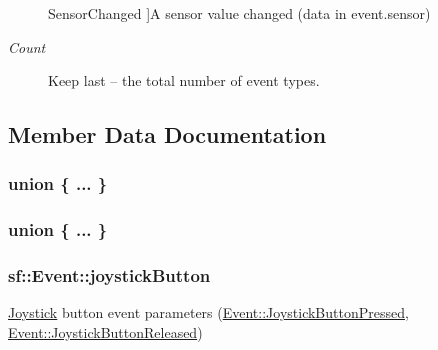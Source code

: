 \begin{Desc}
\begin{description}
{\hypertarget{classsf_1_1_event_af41fa9ed45c02449030699f671331d4aac175c7fb90d3b03cda554ada20d42795}{Sensor\-Changed}\label{classsf_1_1_event_af41fa9ed45c02449030699f671331d4aac175c7fb90d3b03cda554ada20d42795}
}]A sensor value changed (data in event.\-sensor) \item[{\em 
\hypertarget{classsf_1_1_event_af41fa9ed45c02449030699f671331d4aae5c49a2d50ccccd9c941e6be36b0d05f}{Count}\label{classsf_1_1_event_af41fa9ed45c02449030699f671331d4aae5c49a2d50ccccd9c941e6be36b0d05f}
}]Keep last -- the total number of event types. \end{description}
\end{Desc}


\subsection{Member Data Documentation}
\hypertarget{classsf_1_1_event_affe0af14424addee54978fc126da285c}{\subsubsection[{"@11}]{\setlength{\rightskip}{0pt plus 5cm}union \{ ... \} }}\label{classsf_1_1_event_affe0af14424addee54978fc126da285c}
\hypertarget{classsf_1_1_event_a359d4c96713acd4bb7d133c6cde3a063}{\subsubsection[{"@21}]{\setlength{\rightskip}{0pt plus 5cm}union \{ ... \} }}\label{classsf_1_1_event_a359d4c96713acd4bb7d133c6cde3a063}
\hypertarget{classsf_1_1_event_a42aad27a054c1c05bd5c3d020e1db174}{
\subsubsection[{joystick\-Button}]{ sf\-::\-Event\-::joystick\-Button}}\label{classsf_1_1_event_a42aad27a054c1c05bd5c3d020e1db174}


\hyperlink{classsf_1_1_joystick}{Joystick} button event parameters (\hyperlink{classsf_1_1_event_af41fa9ed45c02449030699f671331d4aa048f17d935ca55b7fa063062ed3aa7ee}{Event\-::\-Joystick\-Button\-Pressed}, \hyperlink{classsf_1_1_event_af41fa9ed45c02449030699f671331d4aab7c62947d6d4248d8ff05896f06bd360}{Event\-::\-Joystick\-Button\-Released}) 

